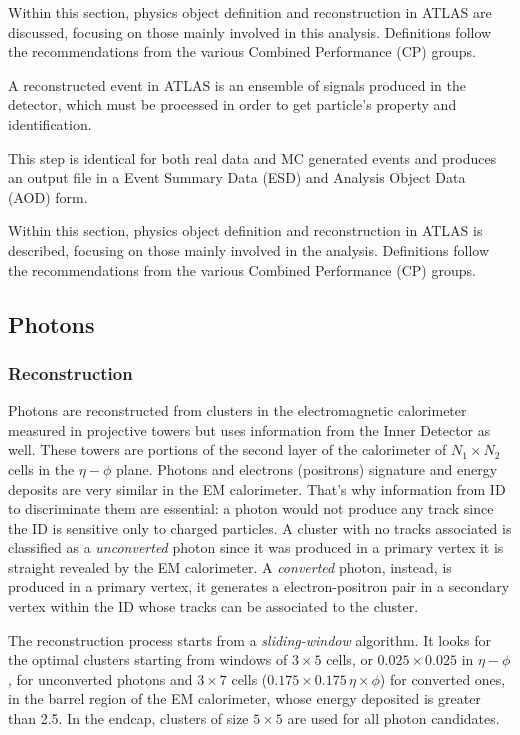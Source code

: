 Within this section, physics object definition and reconstruction in ATLAS are discussed, focusing on those mainly involved in this analysis. Definitions follow the recommendations from the various Combined Performance (CP) groups.

A reconstructed event in ATLAS is an ensemble of signals produced in the detector, which must be processed in order to get particle's property and identification. 

This step is identical for both real data and MC generated events and produces an output file in a Event Summary Data (ESD) and Analysis Object Data (AOD) form. 

Within this section, physics object definition and reconstruction in ATLAS is described, focusing on those mainly involved in the \mph analysis. Definitions follow the recommendations from the various Combined Performance (CP) groups.



\subsection{Photons}
\label{photons}
\subsubsection{Reconstruction}
Photons are reconstructed from clusters in the electromagnetic calorimeter measured in projective towers but uses information from the Inner Detector as well. These towers are portions of the second layer of the calorimeter of $N_1 \times N_2$ cells in the $\eta-\phi$ plane. Photons and electrons (positrons) signature and energy deposits are very similar in the EM calorimeter. That's why information from ID to discriminate them are essential: a photon would not produce any track since the ID is sensitive only to charged particles. A cluster with no tracks associated is classified as a \emph{unconverted} photon since it was produced in a primary vertex it is straight revealed by the EM calorimeter. A \emph{converted} photon, instead, is produced in a primary vertex, it generates a electron-positron pair in a secondary vertex within the ID whose tracks can be associated to the cluster.

The reconstruction process starts from a \emph{sliding-window} algorithm. It looks for the optimal clusters starting from windows of $3\times5$ cells, or $0.025\times0.025$ in $\eta-\phi$, for unconverted photons and $3\times7$ cells ($0.175\times0.175 \, \eta\times\phi$) for converted ones, in the barrel region of the EM calorimeter, whose energy deposited is greater than \SI{2.5}{\gev}. In the endcap, clusters of size $5\times5$ are used for all photon candidates.

